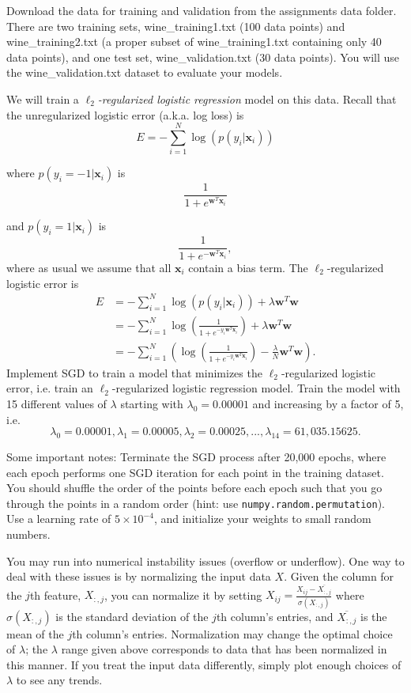 Download the data for training and validation from the assignments data folder.
There are two training sets, wine\_training1.txt (100 data points) and wine\_training2.txt (a proper subset of wine\_training1.txt containing only 40 data points), and one test set, wine\_validation.txt (30 data points). You will use the wine\_validation.txt dataset to evaluate your models.

We will train a \emph{$\ell_2$-regularized logistic regression} model on this data. Recall that the unregularized logistic error (a.k.a. log loss) is
\[E = -\sum_{i=1}^{N}\log(p(y_i | \mathbf{x}_i))\]

where $p(y_i = -1 | \mathbf{x}_i)$ is
\[\frac{1}{1 + e^{\mathbf{w}^T\mathbf{x}_i}}\]

and $p(y_i = 1 | \mathbf{x}_i)$ is
\[\frac{1}{1 + e^{-\mathbf{w}^T\mathbf{x}_i}},\]
where as usual we assume that all $\mathbf{x}_i$ contain a bias term.
The $\ell_2$-regularized logistic error is 
\begin{align*}
  E &= -\sum_{i=1}^{N}\log(p(y_i | \mathbf{x}_i)) + \lambda\mathbf{w}^T\mathbf{w} \\
    &= -\sum_{i=1}^{N} \log \left( \frac{1}{1 + e^{-y_i\mathbf{w}^T\mathbf{x}_i}} \right) + \lambda\mathbf{w}^T\mathbf{w} \\
    &= -\sum_{i=1}^{N} \left(\log \left( \frac{1}{1 + e^{-y_i\mathbf{w}^T\mathbf{x}_i}} \right) - \frac{\lambda}{N}\mathbf{w}^T\mathbf{w}\right).
\end{align*}
Implement SGD to train a model that minimizes the $\ell_2$-regularized logistic error, i.e. train an $\ell_2$-regularized logistic regression model.  Train the model with 15 different values of $\lambda$ starting with $\lambda_0 = 0.00001$ and increasing by a factor of 5, i.e. $$\lambda_0 = 0.00001, \lambda_1 = 0.00005, \lambda_2 = 0.00025, ..., \lambda_{14} = 61,035.15625.$$
\par

Some important notes: Terminate the SGD process after 20,000 epochs, where each epoch performs one SGD iteration for each point in the training dataset. You should shuffle the order of the points before each epoch such that you go through the points in a random order (hint: use \texttt{numpy.random.permutation}). Use a learning rate of $5 \times 10^{-4}$, and initialize your weights to small random numbers. 

You may run into numerical instability issues (overflow or underflow). One way to deal with these issues is by normalizing the input data $X$. Given the column for the $j$th feature, $X_{:,j}$, you can normalize it by setting $X_{ij} = \frac{X_{ij} - \overline{X_{:,j}} }{\sigma(X_{:,j})}$ where $\sigma(X_{:,j})$ is the standard deviation of the $j$th column's entries, and $\overline{X_{:,j}}$ is the mean of the $j$th column's entries. Normalization may change the optimal choice of $\lambda$; the $\lambda$ range given above corresponds to data that has been normalized in this manner. If you treat the input data differently, simply plot enough choices of $\lambda$ to see any trends.

